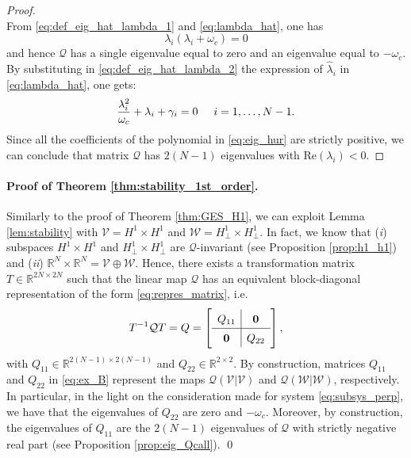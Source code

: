 \documentclass[a4paper]{article}
\theoremstyle{plain}
\newcommand{\Rset}{\mathbb{R}}
\begin{document}
\begin{proof}
\begin{subequations}
	\end{subequations}
	From \eqref{eq:def_eig_hat_lambda_1} and \eqref{eq:lambda_hat}, one has
	\begin{equation*}
	\lambda_i(\lambda_i+\omega_c)=0
	\end{equation*}
	and hence $\mathcal{Q}$ has a single eigenvalue equal to zero and an eigenvalue equal to $-\omega_c$.
	By substituting in \eqref{eq:def_eig_hat_lambda_2} the expression of $\hat\lambda_i$ in \eqref{eq:lambda_hat}, one gets:
	\begin{equation}
	\label{eq:eig_hur}
	\frac{\lambda_i^2}{\omega_c} + \lambda_i + \gamma_i = 0\hspace{5mm}i =1,\dots,N-1.
	\end{equation}
	Since all the coefficients of the polynomial in \eqref{eq:eig_hur} are strictly positive, we can conclude that matrix $\mathcal{Q}$ has $2(N-1)$ eigenvalues with Re$(\lambda_i)<0$.
\end{proof}
\paragraph{Proof of Theorem \ref{thm:stability_1st_order}.}
Similarly to the proof of Theorem \ref{thm:GES_H1}, we can exploit Lemma \ref{lem:stability} with $\mathcal{V}= H^1\times H^1$ and $\mathcal{W} = H^1_{\perp}\times H^1_{\perp}$. In fact, we know that (\textit{i}) subspaces $H^1\times H^1$ and $H^1_{\perp}\times H^1_{\perp}$ are $\mathcal{Q}$-invariant (see Proposition \ref{prop:h1_h1}) and (\textit{ii}) $\Rset^{N}\times\Rset^N = \mathcal{V} \oplus\mathcal{W}$. Hence, there exists a transformation matrix $T\in\Rset^{2N\times 2N}$ such that the linear map $\mathcal{Q}$ has an equivalent block-diagonal representation of the form \eqref{eq:repres_matrix}, i.e. \vspace{3mm}
\begin{equation}
\label{eq:ex_B}
T^{-1}\mathcal{Q} T = Q =
\left[ 
\renewcommand\arraystretch{1.4}
\begin{array}{c|cc}
Q_{11} &  \mathbf{0}  \\
\hline
\mathbf{0}  & Q_{22}\\
\end{array}\right],
\end{equation}
with $Q_{11}\in\mathbb{R}^{2(N-1)\times 2(N-1)}$ and $Q_{22}\in\mathbb{R}^{2\times 2}$.
By construction, matrices $Q_{11}$ and $Q_{22}$ in \eqref{eq:ex_B}
represent the maps $\mathcal{Q}(\mathcal{V}|\mathcal{V})$ and $\mathcal{Q}(\mathcal{W}|\mathcal{W})$, respectively. In particular, in the light on the consideration made for system
\eqref{eq:subsys_perp}, we have that the eigenvalues of $Q_{22}$ are
zero and $-\omega_c$. Moreover, by construction, the eigenvalues of
$Q_{11}$ are the $2(N-1)$ eigenvalues of $\mathcal{Q}$ with strictly negative
real part (see Proposition \ref{prop:eig_Qcall}). \qed     \newpage
\end{document}

